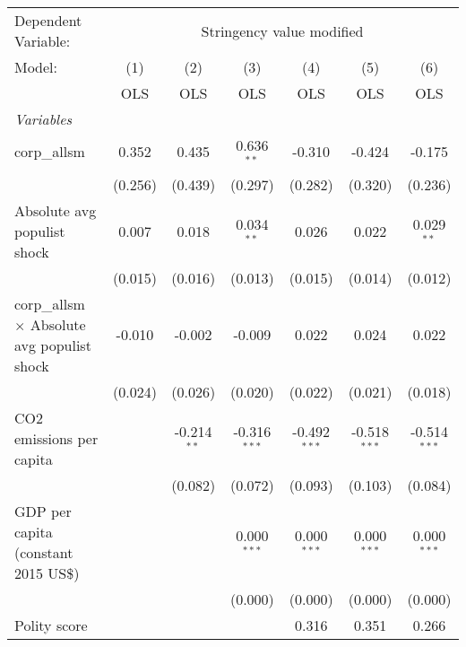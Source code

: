 
\begingroup
\centering
\begin{tabular}{lcccccc}
   \toprule
   Dependent Variable: & \multicolumn{6}{c}{Stringency value modified}\\
   Model:                                             & (1)     & (2)           & (3)            & (4)            & (5)            & (6)\\  
                                                      &  OLS    & OLS           & OLS            & OLS            & OLS            & OLS\\  
   \midrule
   \emph{Variables}\\
   corp\_allsm                                        & 0.352   & 0.435         & 0.636$^{**}$   & -0.310         & -0.424         & -0.175\\   
                                                      & (0.256) & (0.439)       & (0.297)        & (0.282)        & (0.320)        & (0.236)\\   
   Absolute avg populist shock                        & 0.007   & 0.018         & 0.034$^{**}$   & 0.026          & 0.022          & 0.029$^{**}$\\   
                                                      & (0.015) & (0.016)       & (0.013)        & (0.015)        & (0.014)        & (0.012)\\   
   corp\_allsm $\times$ Absolute avg populist shock   & -0.010  & -0.002        & -0.009         & 0.022          & 0.024          & 0.022\\   
                                                      & (0.024) & (0.026)       & (0.020)        & (0.022)        & (0.021)        & (0.018)\\   
   CO2 emissions per capita                           &         & -0.214$^{**}$ & -0.316$^{***}$ & -0.492$^{***}$ & -0.518$^{***}$ & -0.514$^{***}$\\   
                                                      &         & (0.082)       & (0.072)        & (0.093)        & (0.103)        & (0.084)\\   
   GDP per capita (constant 2015 US\$)                &         &               & 0.000$^{***}$  & 0.000$^{***}$  & 0.000$^{***}$  & 0.000$^{***}$\\   
                                                      &         &               & (0.000)        & (0.000)        & (0.000)        & (0.000)\\   
   Polity score                                       &         &               &                & 0.316          & 0.351          & 0.266\\   

\end{tabular}

